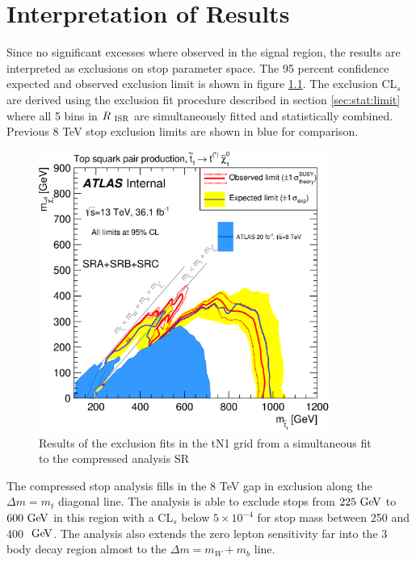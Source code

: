 \chapter{Interpretation of Results}
\label{chap:Interpretation}

\indent Since no significant excesses where observed in the signal region, the results are interpreted as exclusions on stop parameter space.  The 95 percent confidence expected and observed exclusion limit is shown in figure \ref{figure.exclusion.SRC}.  The exclusion CL$_s$ are derived using the exclusion fit procedure described in section \ref{sec:stat:limit} where all 5 bins in $R_{~\mathrm{ISR}}$ are simultaneously fitted and statistically combined. Previous 8 TeV stop exclusion limits are shown in blue for comparison. \\

\begin{figure}[htbp]
	\begin{center}
		\includegraphics[width=0.85\textwidth]{figures/fit/atlascls_m0m12_wband1_showcms0_StopZL2016_SRABC_Tt_directTTplusbWN_all_Output_fixSigXSecNominal_hypotest__1_harvest_list.eps}
		\caption{Results of the exclusion fits in the tN1 grid from a simultaneous fit to the compressed analysis SR}
		\label{figure.exclusion.SRC}
	\end{center}
\end{figure}

\indent  The compressed stop analysis fills in the 8 TeV gap in exclusion along the $\Delta m = m_{t}$ diagonal line.  The analysis is able to exclude stops from $225 \gev$ to $600 \gev$ in this region with a CL$_s$ below $5\times 10^{-4}$ for stop mass between 250 and 400 $\gev$.  The analysis also extends the zero lepton sensitivity far into the 3 body decay region almost to the $\Delta m = m_{W}+m_{b}$ line. \\

